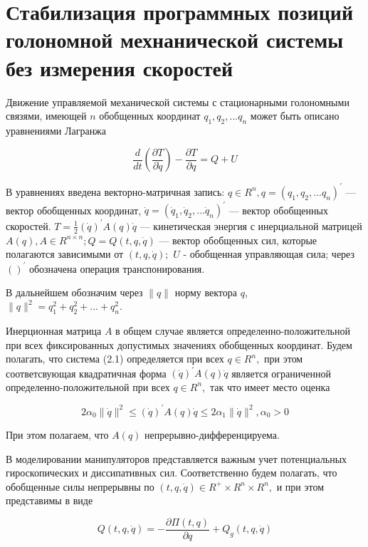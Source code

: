 \section{Стабилизация программных позиций голономной мехнанической системы без измерения скоростей} \label{p12}

Движение управляемой механической системы с стационарными голономными связями, имеющей $n$ обобщенных координат $q_1, q_2, ... q_n$ может быть описано уравнениями Лагранжа 

\begin{equation}
\frac{d}{dt} (\frac{\partial T}{\partial \dot q}) - \frac{\partial T}{\partial q} = Q + U
\end{equation}

 В уравнениях введена векторно-матричная запись: $q \in R^n, q = (q_1, q_2, ... q_n)^{'}$ --- вектор обобщенных координат, $\dot q = (\dot q_1, \dot q_2, ... \dot q_n)^{'}$ --- вектор обобщенных скоростей. $T = \frac{1}{2} (\dot q)^{'} A(q) \dot q$ --- кинетическая энергия с инерциальной матрицей $A(q), A \in R^{n \times n};  Q = Q(t, q, \dot q)$ --- вектор обобщенных сил, которые полагаются зависимыми от $(t, q, \dot q);$ $U$ - обобщенная управляющая сила; через $( )^{'}$ обозначена операция транспонирования. 

В дальнейшем обозначим через $\| q \|$ норму вектора $q$, $\|q\|^{2} = q_1^2 + q_2^2 + ... + q_n^2.$

Инерционная матрица $A$ в общем случае является определенно-положительной при всех фиксированных допустимых значениях обобщенных координат. Будем полагать, что система (2.1) определяется при всех $q \in R^n,$ при этом соответсвующая квадратичная форма $(\dot q)^{'} A(q) \dot q$ является ограниченной определенно-положительной при всех $q \in R^n,$ так что имеет место оценка 

\begin{equation}
2 \alpha_0 \| \dot q \|^2 \le (\dot q)^{'} A(q) \dot q \le 2 \alpha_1 \| \dot q \|^2, \alpha_0 > 0
\end{equation}

При этом полагаем, что $A(q)$ непрерывно-дифференцируема.

В моделировании манипуляторов представляется важным учет потенциальных гироскопических и диссипативных сил. Соответственно будем полагать, что обобщенные силы непрерывны по $(t, q, \dot q) \in R^{+} \times R^{n} \times R^{n},$ и при этом представимы в виде

\begin{equation}
Q(t, q, \dot q) = -\frac{\partial \Pi (t, q)}{\partial q} + Q_g (t, q, \dot q)
\end{equation}

